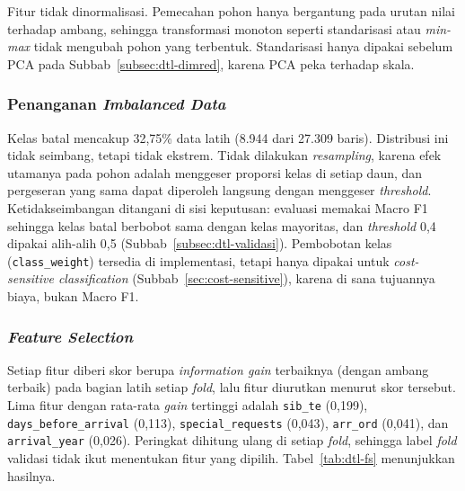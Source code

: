 Fitur tidak dinormalisasi. Pemecahan pohon hanya bergantung pada urutan nilai terhadap ambang,
sehingga transformasi monoton seperti standarisasi atau \textit{min-max} tidak mengubah pohon yang
terbentuk. Standarisasi hanya dipakai sebelum PCA pada Subbab~\ref{subsec:dtl-dimred}, karena PCA
peka terhadap skala.

\subsubsection{Penanganan \textit{Imbalanced Data}}

Kelas batal mencakup 32,75\% data latih (8.944 dari 27.309 baris). Distribusi ini tidak seimbang,
tetapi tidak ekstrem. Tidak dilakukan \textit{resampling}, karena efek utamanya pada pohon adalah
menggeser proporsi kelas di setiap daun, dan pergeseran yang sama dapat diperoleh langsung dengan
menggeser \textit{threshold}. Ketidakseimbangan ditangani di sisi keputusan: evaluasi memakai Macro F1
sehingga kelas batal berbobot sama dengan kelas mayoritas, dan \textit{threshold} 0,4 dipakai alih-alih
0,5 (Subbab~\ref{subsec:dtl-validasi}). Pembobotan kelas (\texttt{class\_weight}) tersedia di
implementasi, tetapi hanya dipakai untuk \textit{cost-sensitive classification}
(Subbab~\ref{sec:cost-sensitive}), karena di sana tujuannya biaya, bukan Macro F1.

\subsubsection{\textit{Feature Selection}}
\label{subsec:dtl-fs}

Setiap fitur diberi skor berupa \textit{information gain} terbaiknya (dengan ambang terbaik) pada
bagian latih setiap \textit{fold}, lalu fitur diurutkan menurut skor tersebut. Lima fitur dengan rata-rata
\textit{gain} tertinggi adalah \texttt{sib\_te} (0,199), \texttt{days\_before\_arrival} (0,113),
\texttt{special\_requests} (0,043), \texttt{arr\_ord} (0,041), dan \texttt{arrival\_year} (0,026).
Peringkat dihitung ulang di setiap \textit{fold}, sehingga label \textit{fold} validasi tidak ikut
menentukan fitur yang dipilih. Tabel~\ref{tab:dtl-fs} menunjukkan hasilnya.

